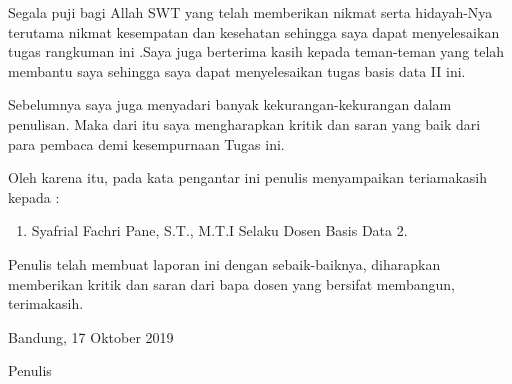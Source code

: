 \begin{acknowledgements}
Segala puji bagi Allah SWT yang telah memberikan nikmat  serta hidayah-Nya terutama nikmat kesempatan dan kesehatan sehingga saya dapat menyelesaikan tugas rangkuman ini .Saya juga berterima kasih kepada teman-teman yang telah membantu saya sehingga saya dapat menyelesaikan tugas basis data II  ini.

Sebelumnya saya juga menyadari banyak kekurangan-kekurangan dalam penulisan. Maka dari itu saya mengharapkan kritik dan saran yang baik dari para pembaca demi kesempurnaan Tugas ini.


Oleh karena itu, pada kata pengantar ini penulis menyampaikan teriamakasih kepada :
\begin{enumerate}

\item  Syafrial Fachri Pane, S.T., M.T.I Selaku Dosen Basis Data 2.
\end{enumerate}

Penulis telah membuat laporan ini dengan sebaik-baiknya, diharapkan memberikan kritik dan saran dari bapa dosen yang bersifat membangun, terimakasih.

\begin{raggedleft}

Bandung, 17 Oktober 2019

Penulis

\end{raggedleft}

\end{acknowledgements}